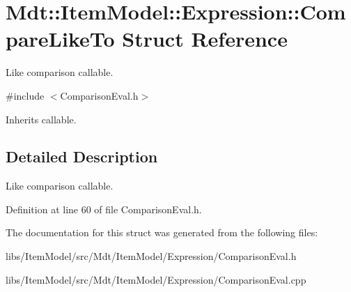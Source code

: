 \hypertarget{struct_mdt_1_1_item_model_1_1_expression_1_1_compare_like_to}{}\section{Mdt\+:\+:Item\+Model\+:\+:Expression\+:\+:Compare\+Like\+To Struct Reference}
\label{struct_mdt_1_1_item_model_1_1_expression_1_1_compare_like_to}


Like comparison callable.  




{\ttfamily \#include $<$Comparison\+Eval.\+h$>$}



Inherits callable.



\subsection{Detailed Description}
Like comparison callable. 

Definition at line 60 of file Comparison\+Eval.\+h.



The documentation for this struct was generated from the following files\+:\begin{DoxyCompactItemize}
\item 
libs/\+Item\+Model/src/\+Mdt/\+Item\+Model/\+Expression/Comparison\+Eval.\+h\item 
libs/\+Item\+Model/src/\+Mdt/\+Item\+Model/\+Expression/Comparison\+Eval.\+cpp\end{DoxyCompactItemize}
